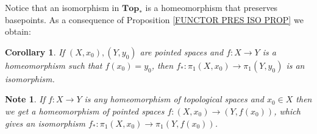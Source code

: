 \documentclass[11pt, letterpaper, oneside]{report}
\theoremstyle{pplain}
\newtheorem{corollary}[theorem]{Corollary}
\theoremstyle{ddefinition}
\newtheorem{note}[theorem]{Note}
\theoremstyle{nnn}
\theoremstyle{eexercise}
\newcommand{\Top}{{\mathbf{Top}}}
\begin{document}
Notice that an isomorphism in $\Top_{\ast}$ is a homeomorphism that preserves basepoints. 
As a consequence of Proposition \ref{FUNCTOR PRES ISO PROP} we obtain:

\begin{corollary}
If $(X, x_{0}), (Y, y_{0})$ are pointed spaces and $f\colon X \to Y$ is a homeomorphism such that 
$f(x_{0}) = y_{0}$, then $f_{\ast}\colon \pi_{1}(X, x_{0})\to \pi_{1}(Y, y_{0})$ is an isomorphism. 
\end{corollary}


\begin{note}
\label{HOMEO FUND GP NOTE}
If $f\colon X \to Y$ is any homeomorphism of topological spaces and $x_{0}\in X$ then 
we  get a homeomorphism of pointed spaces $f\colon (X, x_{0}) \to (Y, f(x_{0}))$, which gives an 
isomorphism $f_{\ast}\colon \pi_{1}(X, x_{0})\to \pi_{1}(Y, f(x_{0}))$. 
\end{note}
\end{document}
